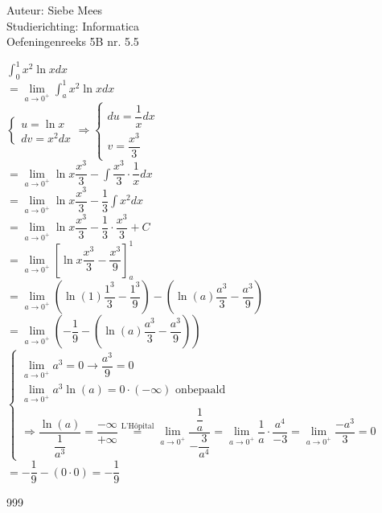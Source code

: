 \documentclass[a4paper]{article}
\begin{document}
  
\noindent \large Auteur: Siebe Mees \\
\noindent \large Studierichting: Informatica\\
\noindent \large Oefeningenreeks 5B nr. 5.5\\

\medskip

\normalsize

$ \displaystyle\int_0^1 x^2 \ln x dx $\\

$ = \lim\limits_{a \rightarrow 0^+} \displaystyle\int_a^1 x^2 \ln x dx $\\

$ \left \{
\begin{array}{l}
u = \ln x \\
dv = x^2 dx
\end{array}
\right . 
\Rightarrow 
\left \{
\begin{array}{l}
du = \dfrac{1}{x} dx \\
v = \dfrac{x^3}{3}
\end{array}
\right . $\\

$ = \lim\limits_{a \rightarrow 0^+} \ln x \dfrac{x^3}{3} - \displaystyle\int \dfrac{x^3}{3} \cdot \dfrac{1}{x} dx $\\

$ = \lim\limits_{a \rightarrow 0^+} \ln x \dfrac{x^3}{3} - \dfrac{1}{3} \displaystyle\int x^2 dx $\\

$ = \lim\limits_{a \rightarrow 0^+} \ln x \dfrac{x^3}{3} - \dfrac{1}{3} \cdot \dfrac{x^3}{3} + C $\\

$ = \lim\limits_{a \rightarrow 0^+} \left[ \ln x \dfrac{x^3}{3} - \dfrac{x^3}{9} \right]_a^1 $\\

$ = \lim\limits_{a \rightarrow 0^+} \left( \ln(1)\dfrac{1^3}{3} - \dfrac{1^3}{9} \right) - \left( \ln(a)\dfrac{a^3}{3} - \dfrac{a^3}{9} \right) $\\

$ = \lim\limits_{a \rightarrow 0^+} \left( -\dfrac{1}{9} - \left( \ln(a)\dfrac{a^3}{3} - \dfrac{a^3}{9} \right) \right) $\\

$ \left \{
\begin{array}{l}
\lim\limits_{a \rightarrow 0^+} a^3 = 0 \rightarrow \dfrac{a^3}{9} = 0 \\

\lim\limits_{a \rightarrow 0^+} a^3 \ln(a) = 0\cdot (-\infty) \text{ onbepaald} \\ 
\Rightarrow \dfrac{\ln(a)}{\dfrac{1}{a^3}} = \dfrac{-\infty}{+\infty} \overset{\text{L'Hôpital}}{=} \lim\limits_{a \rightarrow 0^+} \dfrac{\dfrac{1}{a}}{-\dfrac{3}{a^4}} = \lim\limits_{a \rightarrow 0^+} \dfrac{1}{a} \cdot \dfrac{a^4}{-3} = \lim\limits_{a \rightarrow 0^+} \dfrac{-a^3}{3} = 0
\end{array}
\right . $\\

$ = -\dfrac{1}{9} - \left(0\cdot0\right) = -\dfrac{1}{9} $\\

\begin{thebibliography}{999}
\end{thebibliography}
\end{document}
